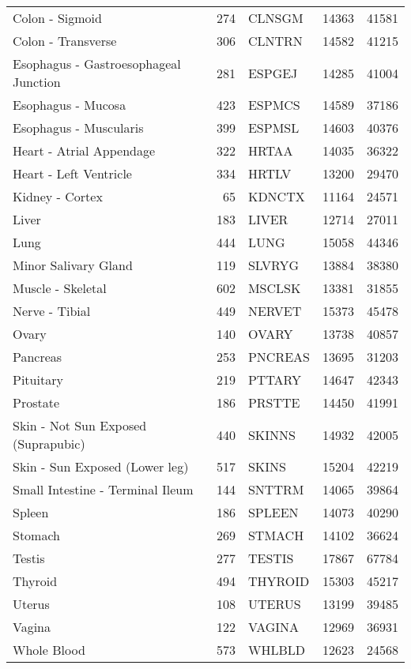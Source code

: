 \begin{table}[ht]
\begin{tabular}{lrlrr}
  Colon - Sigmoid & 274 & CLNSGM & 14363 & 41581 \\ 
  Colon - Transverse & 306 & CLNTRN & 14582 & 41215 \\ 
  Esophagus - Gastroesophageal Junction & 281 & ESPGEJ & 14285 & 41004 \\ 
  Esophagus - Mucosa & 423 & ESPMCS & 14589 & 37186 \\ 
  Esophagus - Muscularis & 399 & ESPMSL & 14603 & 40376 \\ 
  Heart - Atrial Appendage & 322 & HRTAA & 14035 & 36322 \\ 
  Heart - Left Ventricle & 334 & HRTLV & 13200 & 29470 \\ 
  Kidney - Cortex &  65 & KDNCTX & 11164 & 24571 \\ 
  Liver & 183 & LIVER & 12714 & 27011 \\ 
  Lung & 444 & LUNG & 15058 & 44346 \\ 
  Minor Salivary Gland & 119 & SLVRYG & 13884 & 38380 \\ 
  Muscle - Skeletal & 602 & MSCLSK & 13381 & 31855 \\ 
  Nerve - Tibial & 449 & NERVET & 15373 & 45478 \\ 
  Ovary & 140 & OVARY & 13738 & 40857 \\ 
  Pancreas & 253 & PNCREAS & 13695 & 31203 \\ 
  Pituitary & 219 & PTTARY & 14647 & 42343 \\ 
  Prostate & 186 & PRSTTE & 14450 & 41991 \\ 
  Skin - Not Sun Exposed (Suprapubic) & 440 & SKINNS & 14932 & 42005 \\ 
  Skin - Sun Exposed (Lower leg) & 517 & SKINS & 15204 & 42219 \\ 
  Small Intestine - Terminal Ileum & 144 & SNTTRM & 14065 & 39864 \\ 
  Spleen & 186 & SPLEEN & 14073 & 40290 \\ 
  Stomach & 269 & STMACH & 14102 & 36624 \\ 
  Testis & 277 & TESTIS & 17867 & 67784 \\ 
  Thyroid & 494 & THYROID & 15303 & 45217 \\ 
  Uterus & 108 & UTERUS & 13199 & 39485 \\ 
  Vagina & 122 & VAGINA & 12969 & 36931 \\ 
  Whole Blood & 573 & WHLBLD & 12623 & 24568 \\ 
   \hline
\end{tabular}
\end{table}
